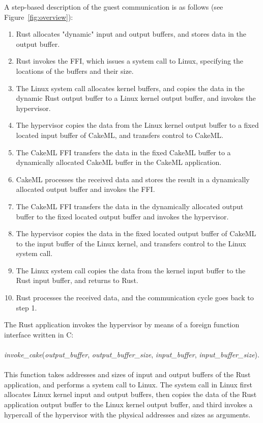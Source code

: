 \documentclass[11pt, a4paper]{article}
\begin{document}
A step-based description of the guest communication is as follows (see
Figure~\ref{fig:overview}):
\begin{enumerate}
\item
	Rust allocates "dynamic" input and output buffers, and stores data in the
	output buffer.
\item
	Rust invokes the FFI, which issues a system call to Linux, specifying the
	locations of the buffers and their size.
\item
	The Linux system call allocates kernel buffers, and copies the data in the
	dynamic Rust output buffer to a Linux kernel output buffer, and invokes the
	hypervisor.
\item
	The hypervisor copies the data from the Linux kernel output buffer to a
	fixed located input buffer of CakeML, and transfers control to CakeML.
\item
	The CakeML FFI transfers the data in the fixed CakeML buffer to a
	dynamically allocated CakeML buffer in the CakeML application.
\item
	CakeML processes the received data and stores the result in a dynamically
	allocated output buffer and invokes the FFI.
\item
	The CakeML FFI transfers the data in the dynamically allocated output buffer
	to the fixed located output buffer and invokes the hypervisor.
\item
	The hypervisor copies the data in the fixed located output buffer of CakeML
	to the input buffer of the Linux kernel, and transfers control to the Linux
	system call.
\item
	The Linux system call copies the data from the kernel input buffer to the
	Rust input buffer, and returns to Rust.
\item
	Rust processes the received data, and the communication cycle goes back to
	step 1.
\end{enumerate}

The Rust application invokes the hypervisor by means of a foreign function
interface written in C:
\\
\\\textit{invoke\_cake}(\textit{output\_buffer}, \textit{output\_buffer\_size}, \textit{input\_buffer}, \textit{input\_buffer\_size}).
\\\\
This function takes addresses and sizes of input and output buffers of the Rust
application, and performs a system call to Linux. The system call in Linux first
allocates Linux kernel input and output buffers, then copies the data of the
Rust application output buffer to the Linux kernel output buffer, and third
invokes a hypercall of the hypervisor with the physical addresses and sizes as
arguments.
\end{document}

